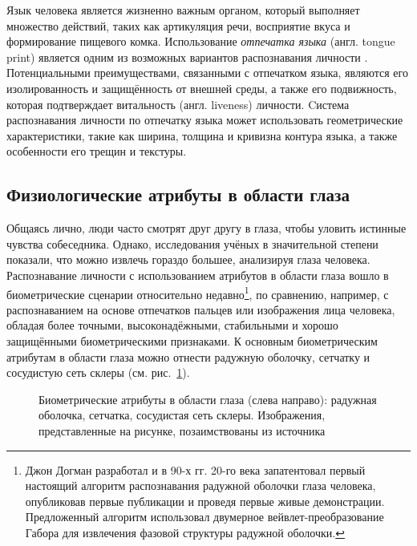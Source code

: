 \documentclass[12pt]{book}
\begin{document}
\large{Язык человека является жизненно важным органом, который выполняет множество действий, таких как артикуляция речи, восприятие вкуса и формирование пищевого комка. Использование \textit{отпечатка языка} (англ. tongue print) является одним из возможных вариантов распознавания личности \cite{unar_2014, bhattacharyya_2023}. Потенциальными преимуществами, связанными с отпечатком языка, являются его изолированность и защищённость от внешней среды, а также его подвижность, которая подтверждает витальность (англ. liveness) личности. Cистема распознавания личности по отпечатку языка может использовать геометрические характеристики, такие как ширина, толщина и кривизна контура языка, а также особенности его трещин и текстуры.}

\subsection{Физиологические атрибуты в области глаза}

\large{Общаясь лично, люди часто смотрят друг другу в глаза, чтобы уловить истинные чувства собеседника. Однако, исследования учёных в значительной степени показали, что можно извлечь гораздо большее, анализируя глаза человека. Распознавание личности с использованием атрибутов в области глаза вошло в биометрические сценарии относительно недавно\footnote{Джон Догман разработал и в 90-х гг. 20-го века запатентовал первый настоящий алгоритм распознавания радужной оболочки глаза человека, опубликовав первые публикации и проведя первые живые демонстрации. Предложенный алгоритм использовал двумерное вейвлет-преобразование Габора для извлечения фазовой структуры радужной оболочки.}, по сравнению, например, с распознаванием на основе отпечатков пальцев или изображения лица человека, обладая более точными, высоконадёжными, стабильными и хорошо защищёнными биометрическими признаками. К основным биометрическим атрибутам в области глаза можно отнести радужную оболочку, сетчатку и сосудистую сеть склеры (см. рис.~\ref{fig:figure_1_4}).}

\begin{figure}[h]
\caption{Биометрические атрибуты в области глаза (слева направо): радужная оболочка, сетчатка, сосудистая сеть склеры. Изображения, представленные на рисунке, позаимствованы из источника \cite{unar_2014}}
\label{fig:figure_1_4}
\end{figure}
\end{document}

